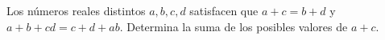 Los números reales distintos $a,b,c,d$ satisfacen que $a+c = b+d$ y $a+b+cd = c+d+ab$. Determina la suma de los posibles valores de $a + c$.